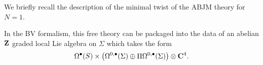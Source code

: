 \documentclass[11pt]{amsart}%
\begin{document}
\parsec

We briefly recall the description of the minimal twist of the ABJM theory for $N=1$.


In the BV formalism, this free theory can be packaged into the data of an abelian $\mathbf{Z}$ graded local Lie algebra on $\Sigma$ which takes the form
\[
\Omega^{\bullet}(S)\times \left (\Omega^{0,\bullet}(\Sigma) \oplus \Pi \Omega^{0,\bullet} (\Sigma )\right ) \otimes \mathbf{C}^{4}.
\]




%
%
%
%
%
%
%
\end{document}
